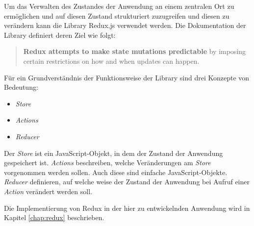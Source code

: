Um das Verwalten des Zustandes der Anwendung an einem zentralen Ort zu ermöglichen und auf diesen Zustand strukturiert zuzugreifen und diesen zu verändern kann die Library Redux.js\footnotemark{} verwendet werden. Die Dokumentation der Library definiert deren Ziel wie folgt:


\begin{quote}
  \textbf{Redux attempts to make state mutations predictable} by imposing certain restrictions on how and when updates can happen. \cite{ReduxMotivation}
\end{quote}

Für ein Grundverständnis der Funktionsweise der Library sind drei Konzepte von Bedeutung:

\begin{itemize}
  \item \textit{Store}
  \item \textit{Actions}
  \item \textit{Reducer}
\end{itemize}

Der \textit{Store} ist ein JavaScript-Objekt, in dem der Zustand der Anwendung gespeichert ist. \textit{Actions} beschreiben, welche Veränderungen am \textit{Store} vorgenommen werden sollen. Auch diese sind einfache JavaScript-Objekte. \textit{Reducer} definieren, auf welche weise der Zustand der Anwendung bei Aufruf einer \textit{Action} verändert werden soll. \cite{ReduxCore}

Die Implementierung von Redux in der hier zu entwickelnden Anwendung wird in Kapitel \ref{chap:redux} beschrieben.
